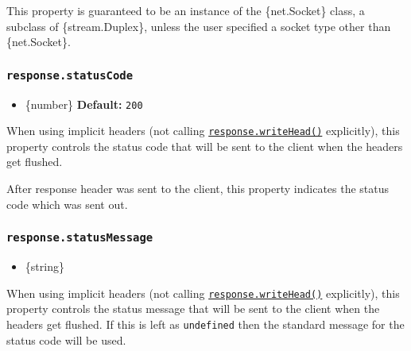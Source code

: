 This property is guaranteed to be an instance of the \{net.Socket\}
class, a subclass of \{stream.Duplex\}, unless the user specified a
socket type other than \{net.Socket\}.

\subsubsection{\texorpdfstring{\texttt{response.statusCode}}{response.statusCode}}\label{response.statuscode}

\begin{itemize}
\tightlist
\item
  \{number\} \textbf{Default:} \texttt{200}
\end{itemize}

When using implicit headers (not calling
\hyperref[responsewriteheadstatuscode-statusmessage-headers]{\texttt{response.writeHead()}}
explicitly), this property controls the status code that will be sent to
the client when the headers get flushed.

\begin{Shaded}
\begin{Highlighting}[]
 \OperatorTok{=} \OperatorTok{;}
\end{Highlighting}
\end{Shaded}

After response header was sent to the client, this property indicates
the status code which was sent out.

\subsubsection{\texorpdfstring{\texttt{response.statusMessage}}{response.statusMessage}}\label{response.statusmessage}

\begin{itemize}
\tightlist
\item
  \{string\}
\end{itemize}

When using implicit headers (not calling
\hyperref[responsewriteheadstatuscode-statusmessage-headers]{\texttt{response.writeHead()}}
explicitly), this property controls the status message that will be sent
to the client when the headers get flushed. If this is left as
\texttt{undefined} then the standard message for the status code will be
used.

\begin{Shaded}
\begin{Highlighting}[]
 \OperatorTok{=} \OperatorTok{;}
\end{Highlighting}
\end{Shaded}


